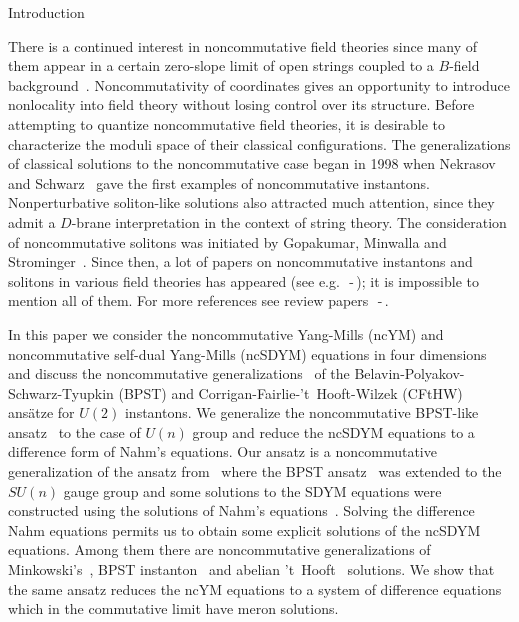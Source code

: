 \documentclass[a4paper,11pt]{article}
\makeatletter
\renewcommand{\section}{\@startsection{section}{1}{0pt}{\medskipamount}
{\medskipamount}{\large\bf}}
\numberwithin{equation}{section}
\makeatother
\begin{document}
\section{Introduction}

There is a continued interest in  noncommutative 
field theories since many of them appear in a certain zero-slope
limit of open strings coupled to a $B$-field background~\cite{Seiberg:1999}.
Noncommutativity of coordinates gives an opportunity
to introduce nonlocality into field theory without losing control 
over its structure. Before attempting to quantize noncommutative 
field theories, it is desirable to characterize the moduli space of 
their classical configurations. The generalizations of classical 
solutions to the noncommutative case began in 1998 when Nekrasov and 
Schwarz~\cite{NS} gave the first examples of noncommutative instantons. 
Nonperturbative soliton-like solutions also attracted much attention, 
since they admit a $D$-brane interpretation in the context of string 
theory. The consideration of noncommutative solitons was initiated by 
Gopakumar, Minwalla and Strominger~\cite{Gopakumar:2000}. Since then, 
a lot of papers on noncommutative instantons and solitons in various 
field theories has appeared (see e.g.~\cite{Fur}\,-\,\cite{Ishikawa}); 
it is impossible to mention all of them. For more references see 
review papers~\cite{Nekrasov}\,-\,\cite{Konechny:2001}.

In this paper we consider the  noncommutative Yang-Mills (ncYM) and 
noncommutative self-dual Yang-Mills (ncSDYM) equations in four dimensions 
and discuss the noncommutative generalizations~\cite{Correa1, LP1} of the 
Belavin-Polyakov-Schwarz-Tyupkin (BPST) and Corrigan-Fairlie-'t~Hooft-Wilzek 
(CFtHW) ans\"atze for $U(2)$ instantons. We generalize the noncommutative 
BPST-like ansatz~\cite{Correa1} to the case of $U(n)$ group and  reduce the 
ncSDYM equations to a difference form of Nahm's equations.  Our ansatz is a 
noncommutative generalization of the ansatz from~\cite{Ivanova:tu} 
where the BPST ansatz~\cite{Belavin} was extended to the $SU(n)$ gauge group 
and some solutions to the SDYM equations were constructed using the solutions 
of Nahm's equations~\cite{Nahm}. Solving the difference Nahm equations permits 
us to obtain some explicit solutions of the ncSDYM equations. Among them there 
are  noncommutative generalizations of Minkowski's~\cite{Mink}, 
BPST instanton~\cite{Belavin} and abelian 't~Hooft~\cite{'tHooft} solutions.
We show that the same ansatz reduces the ncYM equations to a system of 
difference equations which in the commutative limit have meron solutions.                          
\end{document}
